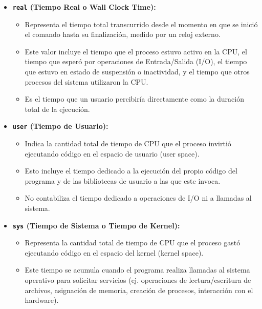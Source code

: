 \documentclass{article}
\begin{document}
	\begin{itemize}[leftmargin=*,noitemsep,topsep=0pt]
		\item \textbf{\texttt{real} (Tiempo Real o Wall Clock Time):}
		\begin{itemize}[leftmargin=*,noitemsep,topsep=0pt]
			\item Representa el tiempo total transcurrido desde el momento en que se inició el comando hasta su finalización, medido por un reloj externo.
			\item Este valor incluye el tiempo que el proceso estuvo activo en la CPU, el tiempo que esperó por operaciones de Entrada/Salida (I/O), el tiempo que estuvo en estado de suspensión o inactividad, y el tiempo que otros procesos del sistema utilizaron la CPU.
			\item Es el tiempo que un usuario percibiría directamente como la duración total de la ejecución.
		\end{itemize}
		
		\item \textbf{\texttt{user} (Tiempo de Usuario):}
		\begin{itemize}[leftmargin=*,noitemsep,topsep=0pt]
			\item Indica la cantidad total de tiempo de CPU que el proceso invirtió ejecutando código en el espacio de usuario (user space).
			\item Esto incluye el tiempo dedicado a la ejecución del propio código del programa y de las bibliotecas de usuario a las que este invoca.
			\item No contabiliza el tiempo dedicado a operaciones de I/O ni a llamadas al sistema.
		\end{itemize}
		
		\item \textbf{\texttt{sys} (Tiempo de Sistema o Tiempo de Kernel):}
		\begin{itemize}[leftmargin=*,noitemsep,topsep=0pt]
			\item Representa la cantidad total de tiempo de CPU que el proceso gastó ejecutando código en el espacio del kernel (kernel space).
			\item Este tiempo se acumula cuando el programa realiza llamadas al sistema operativo para solicitar servicios (ej. operaciones de lectura/escritura de archivos, asignación de memoria, creación de procesos, interacción con el hardware).
		\end{itemize}
	\end{itemize}
	
	
\end{document}
